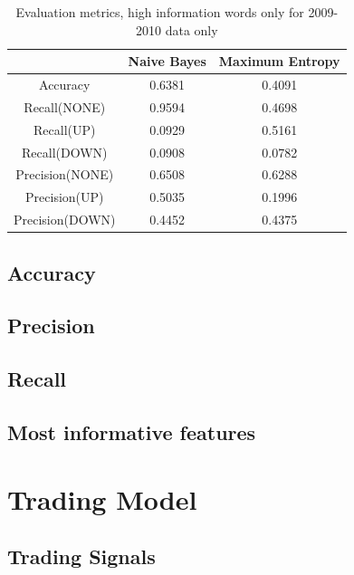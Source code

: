 \documentclass[]{article}
\begin{document}
\begin{table}
\centering
\begin{tabular}{|c|c|c|}
\hline
& Naive Bayes & Maximum Entropy\\
\hline
Accuracy & 0.6381& 0.4091\\
\hline
Recall(NONE) & 0.9594 & 0.4698\\
\hline
Recall(UP) & 0.0929 & 0.5161 \\
\hline
Recall(DOWN) & 0.0908 &  0.0782 \\
\hline
Precision(NONE) & 0.6508 & 0.6288 \\
\hline
Precision(UP) & 0.5035  & 0.1996 \\
\hline
Precision(DOWN) & 0.4452 & 0.4375 \\
\hline

\end{tabular}
\caption{Evaluation metrics, high information words only for 2009-2010 data only}
\end{table}

\subsection{Accuracy}


\subsection{Precision}

\subsection{Recall}
\subsection{Most informative features}
\section{Trading Model}
\subsection{Trading Signals}
\end{document}
